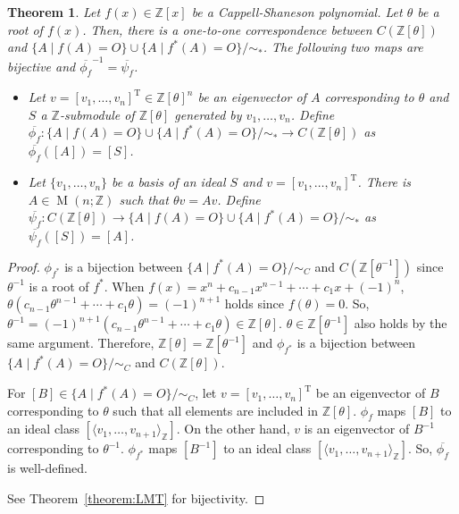\documentclass[12pt]{amsart}
\theoremstyle{plain}
\newtheorem{theorem}{Theorem}[section]
\theoremstyle{definition}
\theoremstyle{remark}
\renewcommand{\(}{\big(}
\renewcommand{\)}{\big)}
\theoremstyle{plain}
\theoremstyle{definition}
\begin{document}
\begin{theorem}    
    Let $f(x) \in \mathbb{Z}[x]$ be a Cappell-Shaneson polynomial. Let $\theta$ be a root of $f(x)$. Then, there is a one-to-one correspondence between $C(\mathbb{Z}[\theta])$ and $\{A\mid f(A)=O\}\cup\{A\mid f^*(A)=O\}/\sim_*$. The following two maps are bijective and $\overline{\phi_f}^{-1} = \overline{\psi_f}$.
     \begin{itemize}
         \item Let $v=[v_1, \ldots, v_n]^\mathrm{T}\in\mathbb{Z}[\theta]^n$ be an eigenvector of $A$ corresponding to $\theta$ and $S$ a $\mathbb{Z}$-submodule of $\mathbb{Z}[\theta]$ generated by $v_1,\ldots,v_n$. Define $\overline{\phi_f} : \{A\mid f(A)=O\}\cup\{A\mid f^*(A)=O\}/\sim_* \rightarrow C(\mathbb{Z}[\theta])$ as $\overline{\phi_f}([A])=[S]$. 
         \item Let $\{v_1, \ldots, v_n\}$ be a basis of an ideal $S$ and $v=[v_1,\ldots,v_n]^\mathrm{T}$. There is $A\in \operatorname{M}(n;\mathbb{Z})$ such that $\theta v=A v$. Define $\overline{\psi_f} : C(\mathbb{Z}[\theta]) \rightarrow \{A\mid f(A)=O\}\cup\{A\mid f^*(A)=O\}/\sim_*$ as $\overline{\psi_f}([S])=[A]$.
     \end{itemize}
\end{theorem}
\begin{proof}
    $\phi_{f^*}$ is a bijection between $\{A\mid f^*(A)=O\}/\sim_C$ and $C(\mathbb{Z}[\theta^{-1}])$ since $\theta^{-1}$ is a root of $f^*$. When $f(x)=x^n+c_{n-1}x^{n-1}+\cdots+c_1x+(-1)^n$, $\theta(c_{n-1}\theta^{n-1}+\cdots+c_1\theta)=(-1)^{n+1}$ holds since $f(\theta)=0$. So, $\theta^{-1}=(-1)^{n+1}(c_{n-1}\theta^{n-1}+\cdots+c_1\theta)\in \mathbb{Z}[\theta]$. $\theta \in \mathbb{Z}[\theta^{-1}]$ also holds by the same argument. Therefore, $\mathbb{Z}[\theta]=\mathbb{Z}[\theta^{-1}]$ and $\phi_{f^*}$ is a bijection between $\{A\mid f^*(A)=O\}/\sim_C$ and $C(\mathbb{Z}[\theta])$. 

    For $[B] \in \{A\mid f^*(A)=O\}/\sim_C$, let $v=[ v_1, \ldots, v_n ]^\mathrm{T}$ be an eigenvector of $B$ corresponding to $\theta$ such that all elements are included in $\mathbb{Z}[\theta]$. $\phi_f$ maps $[B]$ to an ideal class $[\langle v_1, \ldots, v_{n+1} \rangle_\mathbb{Z}]$. On the other hand, $v$ is an eigenvector of $B^{-1}$ corresponding to $\theta^{-1}$.  $\phi_{f^*}$ maps $[B^{-1}]$ to an ideal class $[\langle v_1, \ldots, v_{n+1} \rangle_\mathbb{Z}]$. So, $\overline{\phi_f}$ is well-defined.

    See Theorem~\ref{theorem:LMT} for bijectivity.
\end{proof}
\end{document}
